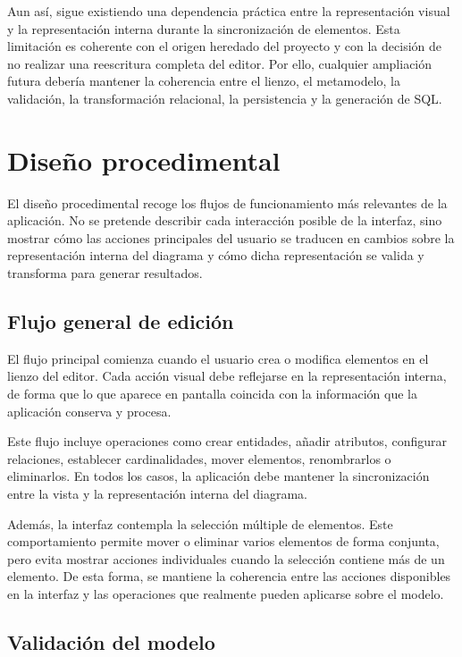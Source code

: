 Aun así, sigue existiendo una dependencia práctica entre la representación visual y la representación interna durante la sincronización de elementos. Esta limitación es coherente con el origen heredado del proyecto y con la decisión de no realizar una reescritura completa del editor. Por ello, cualquier ampliación futura debería mantener la coherencia entre el lienzo, el metamodelo, la validación, la transformación relacional, la persistencia y la generación de SQL.

\section{Diseño procedimental}

El diseño procedimental recoge los flujos de funcionamiento más relevantes de la aplicación. No se pretende describir cada interacción posible de la interfaz, sino mostrar cómo las acciones principales del usuario se traducen en cambios sobre la representación interna del diagrama y cómo dicha representación se valida y transforma para generar resultados.

\subsection{Flujo general de edición}

El flujo principal comienza cuando el usuario crea o modifica elementos en el lienzo del editor. Cada acción visual debe reflejarse en la representación interna, de forma que lo que aparece en pantalla coincida con la información que la aplicación conserva y procesa.

Este flujo incluye operaciones como crear entidades, añadir atributos, configurar relaciones, establecer cardinalidades, mover elementos, renombrarlos o eliminarlos. En todos los casos, la aplicación debe mantener la sincronización entre la vista y la representación interna del diagrama.

Además, la interfaz contempla la selección múltiple de elementos. Este comportamiento permite mover o eliminar varios elementos de forma conjunta, pero evita mostrar acciones individuales cuando la selección contiene más de un elemento. De esta forma, se mantiene la coherencia entre las acciones disponibles en la interfaz y las operaciones que realmente pueden aplicarse sobre el modelo.

\subsection{Validación del modelo}

